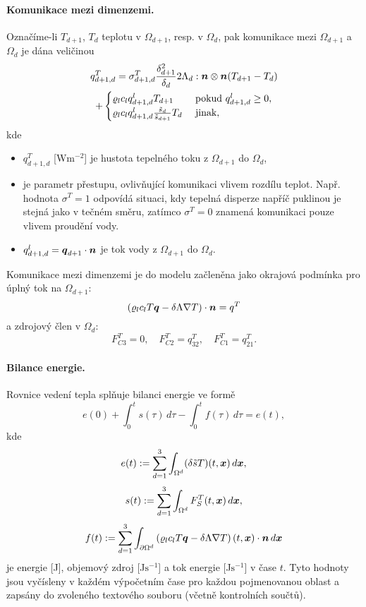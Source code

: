 \paragraph{Komunikace mezi dimenzemi.}
Označíme-li $T_{d+1}$, $T_d$ teplotu v $\Omega_{d+1}$, resp. v $\Omega_d$, pak komunikace mezi $\Omega_{d+1}$ a $\Omega_d$ je dána veličinou
\begin{multline}
  \label{e:inter_dim_flux_heat}
  q^T_{d+1,d} = \sigma^T_{d+1,d} \frac{\delta_{d+1}^2}{\delta_d}2\Lambda_d:\mathbf{\boldsymbol{n}}\otimes\mathbf{\boldsymbol{n}} ( T_{d+1} - T_d)\\
  + \begin{cases} \varrho_l c_l q^l_{d+1,d} T_{d+1} & \mbox{ pokud }q^l_{d+1,d}\ge 0,\\\varrho_l c_l q^l_{d+1,d} \frac{\tilde s_d}{\tilde s_{d+1}} T_d & \mbox{ jinak},\end{cases}
\end{multline}
kde
\begin{itemize}
\item $q^T_{d+1,d}$ [W$\mathrm{m}^{-2}$] je hustota tepelného toku z $\Omega_{d+1}$ do $\Omega_d$,
\item {} \units{}{}{} je parametr přestupu, ovlivňující komunikaci vlivem rozdílu teplot.
Např. hodnota $\sigma^T=1$ odpovídá situaci, kdy tepelná disperze napříč puklinou je stejná jako v tečném směru, zatímco $\sigma^T=0$ znamená komunikaci pouze vlivem proudění vody.
\item $q^l_{d+1,d}=\mathbf{\boldsymbol{q}}_{d+1}\cdot\mathbf{\boldsymbol{n}}$ je tok vody z $\Omega_{d+1}$ do $\Omega_d$.
\end{itemize}
Komunikace mezi dimenzemi je do modelu začleněna jako okrajová podmínka pro úplný tok na $\Omega_{d+1}$:
\begin{equation}
\label{e:heat_FC}
\left(\varrho_l c_l T \mathbf{\boldsymbol{q}} - \delta\Lambda\nabla T\right)\cdot\mathbf{\boldsymbol{n}} = q^T
\end{equation}
a zdrojový člen v $\Omega_d$:
\begin{equation}
F^T_{C3} = 0,\quad
F^T_{C2} = q^T_{32},\quad
F^T_{C1} = q^T_{21}.
\end{equation}




\paragraph{Bilance energie.}
Rovnice vedení tepla splňuje bilanci energie ve formě
$$ e(0) + \int_0^t s(\tau) \,d\tau - \int_0^t f(\tau) \,d\tau = e(t), $$
kde
$$ e(t) := \sum_{d=1}^3\int_{\Omega^d}(\delta \tilde s T)(t,\mathbf{\boldsymbol{x}})\,d\mathbf{\boldsymbol{x}}, $$
$$ s(t) := \sum_{d=1}^3\int_{\Omega^d}F_S^T(t,\mathbf{\boldsymbol{x}})\,d\mathbf{\boldsymbol{x}}, $$
$$ f(t) := \sum_{d=1}^3\int_{\partial\Omega^d}\left(\varrho_l c_l T\mathbf{\boldsymbol{q}} - \delta\Lambda\nabla T\right)(t,\mathbf{\boldsymbol{x}})\cdot\mathbf{\boldsymbol{n}} \,d\mathbf{\boldsymbol{x}} $$
je energie [J], objemový zdroj [J$\mathrm{s}^{-1}$] a tok energie [J$\mathrm{s}^{-1}$] v čase $t$.
Tyto hodnoty jsou vyčísleny v každém výpočetním čase pro každou pojmenovanou oblast a zapsány do zvoleného textového souboru (včetně kontrolních součtů).





